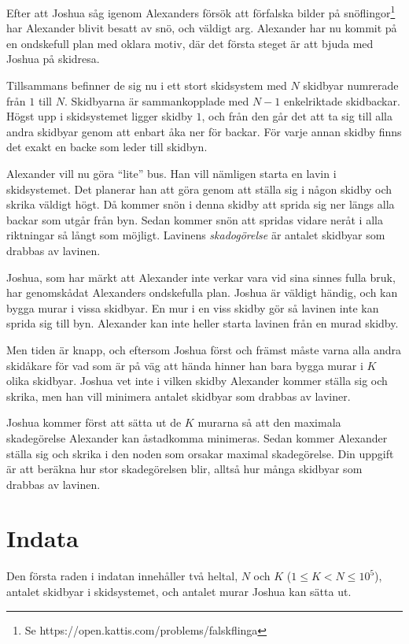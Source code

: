 \noindent
Efter att Joshua såg igenom Alexanders försök att förfalska bilder på snöflingor\footnote{Se https://open.kattis.com/problems/falskflinga}
har Alexander blivit besatt av snö, och väldigt arg.
Alexander har nu kommit på en ondskefull plan med oklara motiv,
där det första steget är att bjuda med Joshua på skidresa.

Tillsammans befinner de sig nu i ett stort skidsystem med $N$ skidbyar numrerade från $1$ till $N$.
Skidbyarna är sammankopplade med $N-1$ enkelriktade skidbackar.
Högst upp i skidsystemet ligger skidby $1$,
och från den går det att ta sig till alla andra
skidbyar genom att enbart åka ner för backar.
För varje annan skidby finns det exakt en backe som leder till skidbyn.

Alexander vill nu göra ``lite'' bus. 
Han vill nämligen starta en lavin i skidsystemet.
Det planerar han att göra genom att ställa sig i någon skidby och skrika väldigt högt.
Då kommer snön i denna skidby att sprida sig ner längs alla backar som utgår från byn.
Sedan kommer snön att spridas vidare neråt i alla riktningar så långt som möjligt.
Lavinens \emph{skadogörelse} är antalet skidbyar som drabbas av lavinen.

Joshua, som har märkt att Alexander inte verkar vara vid sina sinnes fulla bruk,
har genomskådat Alexanders ondskefulla plan.
Joshua är väldigt händig, och kan bygga murar i vissa skidbyar.
En mur i en viss skidby gör så lavinen inte kan sprida sig till byn.
Alexander kan inte heller starta lavinen från en murad skidby.

Men tiden är knapp, och eftersom Joshua först och främst måste varna alla andra skidåkare för vad som är på väg att hända
hinner han bara bygga murar i $K$ olika skidbyar.
Joshua vet inte i vilken skidby Alexander kommer ställa sig och skrika,
men han vill minimera antalet skidbyar som drabbas av laviner.

Joshua kommer först att sätta ut de $K$ murarna så att den maximala skadegörelse
Alexander kan åstadkomma minimeras.
Sedan kommer Alexander ställa sig och skrika i den noden som orsakar maximal skadegörelse.
Din uppgift är att beräkna hur stor skadegörelsen blir,
alltså hur många skidbyar som drabbas av lavinen. 


\section*{Indata}
Den första raden i indatan innehåller två heltal, $N$ och $K$ ($1 \le K < N \le 10^5$), 
antalet skidbyar i skidsystemet, och antalet murar Joshua kan sätta ut.

